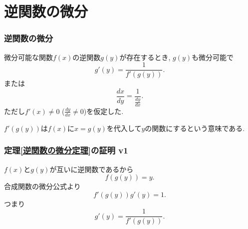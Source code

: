
\section{逆関数の微分}


\begin{frame}
\frametitle{逆関数の微分}

\begin{Thm} \label{逆関数の微分定理}
微分可能な関数$f(x)$の逆関数$g(y)$が存在するとき, $g(y)$も微分可能で
$$
g'(y)= \frac{1}{f'(g(y))}. 
$$
または
$$
\frac{dx}{dy}=\frac{1}{\frac{dy}{dx}}. 
$$
ただし$f'(x)\neq 0$ ($\frac{dy}{dx} \neq0$)を仮定した. 
\end{Thm}
$f'(g(y))$は$f(x)$に$x=g(y)$を代入して$y$の関数にするという意味である. 



\end{frame}






\begin{frame}
\frametitle{定理\ref{逆関数の微分定理}の証明 v1}

$f(x)$と$g(y)$が互いに逆関数であるから
$$
f(g(y))=y. 
$$
合成関数の微分公式より
$$
f'(g(y))g'(y)=1. 
$$
つまり
$$
g'(y)= \frac{1}{f'(g(y))}. 
$$


\end{frame}





%
%
%




